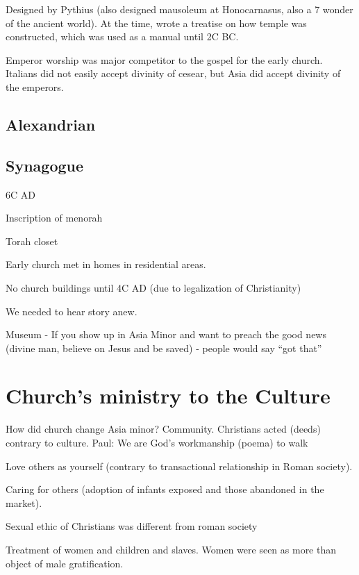 \documentclass[
]{book}
\begin{document}
Designed by Pythius (also designed mausoleum at Honocarnasus, also a 7 wonder of the ancient world). At the time, wrote a treatise on how temple was constructed, which was used as a manual until 2C BC.

Emperor worship was major competitor to the gospel for the early church. Italians did not easily accept divinity of cesear, but Asia did accept divinity of the emperors.

\hypertarget{alexandrian}{%
\subsection{Alexandrian}\label{alexandrian}}

\hypertarget{synagogue}{%
\subsection{Synagogue}\label{synagogue}}

6C AD

Inscription of menorah

Torah closet

Early church met in homes in residential areas.

No church buildings until 4C AD (due to legalization of Christianity)

We needed to hear story anew.

Museum - If you show up in Asia Minor and want to preach the good news (divine man, believe on Jesus and be saved) - people would say ``got that''

\hypertarget{churchs-ministry-to-the-culture}{%
\section{Church's ministry to the Culture}\label{churchs-ministry-to-the-culture}}

How did church change Asia minor? Community. Christians acted (deeds) contrary to culture. Paul: We are God's workmanship (poema) to walk

Love others as yourself (contrary to transactional relationship in Roman society).

Caring for others (adoption of infants exposed and those abandoned in the market).

Sexual ethic of Christians was different from roman society

Treatment of women and children and slaves. Women were seen as more than object of male gratification.
\end{document}

